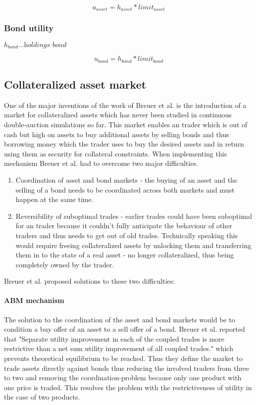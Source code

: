 \documentclass[../Bachelorarbeit.tex]{subfiles}
\begin{document}
\begin{equation}
u_{asset} = h_{asset} * limit_{asset}
\end{equation}

\subsubsection{Bond utility}
$h_{bond} \dots \textit{holdings bond}$ 

\begin{equation}
u_{bond} = h_{bond} * limit_{bond}
\end{equation}

\subsection{Collateralized asset market}
One of the major inventions of the work of Breuer et al. is the introduction of a market for collateralized assets which has never been studied in continuous double-auction simulations so far. This market enables an trader which is out of cash but high on assets to buy additional assets by selling bonds and thus borrowing money which the trader uses to buy the desired assets and in return using them as security for collateral constraints. When implementing this mechanism Breuer et al. had to overcome two major difficulties.

\begin{enumerate}
\item Coordination of asset and bond markets - the buying of an asset and the selling of a bond needs to be coordinated across both markets and must happen at the same time.
\item Reversibility of suboptimal trades - earlier trades could have been suboptimal for an trader because it couldn't fully anticipate the behaviour of other traders and thus needs to get out of old trades. Technically speaking this would require freeing collateralized assets by unlocking them and transferring them in to the state of a real asset - no longer collateralized, thus being completely owned by the trader.
\end{enumerate}

Breuer et al. proposed solutions to these two difficulties:
\paragraph{ABM mechanism}
The solution to the coordination of the asset and bond markets would be to condition a buy offer of an asset to a sell offer of a bond. Breuer et al. reported that "Separate utility improvement in each of the coupled trades is more restrictive than a net sum utility improvement of all coupled trades." which prevents theoretical equilibrium to be reached. Thus they define the market to trade assets directly against bonds thus reducing the involved traders from three to two and removing the coordination-problem because only one product with one price is traded. This resolves the problem with the restrictiveness of utility in the case of two products.
\end{document}
